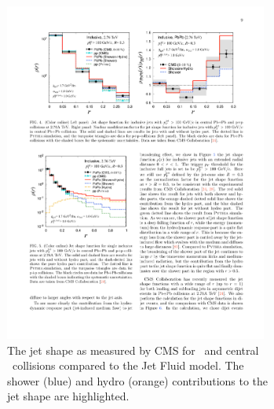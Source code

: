 \begin{figure}
\begin{subfigure}{.45\textwidth}
  \centering
\includegraphics[width=0.95\textwidth]{figures/jetMeasurements/JF_jetShape}
\caption{The jet shape as measured by CMS for \pp\ and central \pbpb\ collisions \cite{Chatrchyan:2013kwa} compared to the Jet Fluid model.
The shower (blue) and hydro (orange) contributions to the jet shape are highlighted.}
\label{fig:jf_jetshape}
\end{subfigure} \qquad
\begin{subfigure}{.45\textwidth}
  \centering

\end{subfigure}
\end{figure}
